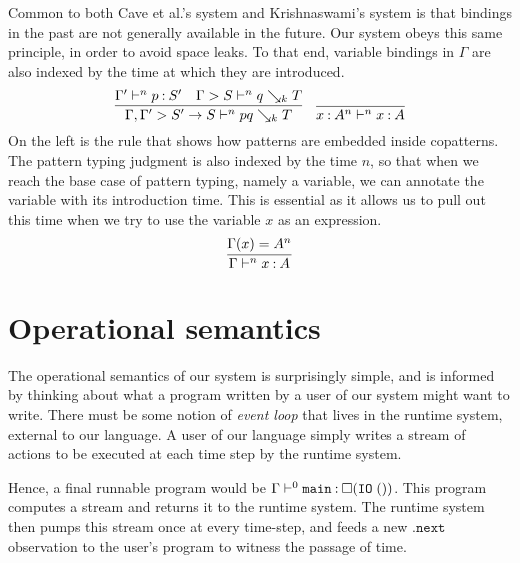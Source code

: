 \documentclass[11pt]{article}
\newcommand{\fun}{\mathtt{fun}}
\newcommand{\always}{\square}
\renewcommand{\next}{\mathtt{.next}}
\renewcommand{\synth}{\searrow}
\newcommand{\IO}{\mathtt{IO}}
\begin{document}
Common to both Cave et al.'s system and Krishnaswami's system is that bindings
in the past are not generally available in the future.
Our system obeys this same principle, in order to avoid space leaks.
To that end, variable bindings in $\Gamma$ are also indexed by the time at
which they are introduced.
%
\begin{equation*}
  \infer{
    \Gamma, \Gamma^\prime > S^\prime \to S \proves^n p q \synth_k T
  }{
    \Gamma^\prime \proves^n p \hastype S^\prime
    &
    \Gamma > S \proves^n q \synth_k T
  }
  \quad
  \infer{
    x \hastype A^n \proves^n x \hastype A
  }{}
\end{equation*}
%
On the left is the rule that shows how patterns are embedded inside copatterns.
The pattern typing judgment is also indexed by the time $n$, so that when we
reach the base case of pattern typing, namely a variable, we can annotate the
variable with its introduction time.
%
This is essential as it allows us to pull out this time when we try to use the
variable $x$ as an expression.
%
\begin{equation*}
  \infer{
    \Gamma \proves^n x \hastype A
  }{
    \Gamma(x) = A^n
  }
\end{equation*}


\section{Operational semantics}
\label{sec:operational}

The operational semantics of our system is surprisingly simple, and is informed
by thinking about what a program written by a user of our system might want to
write.
There must be some notion of \emph{event loop} that lives in the runtime
system, external to our language.
A user of our language simply writes a stream of actions to be executed at
each time step by the runtime system.

Hence, a final runnable program would be
$\Gamma \proves^0 \mathtt{main} \hastype \always (\IO\; ())$.
This program computes a stream and returns it to the runtime system.
The runtime system then pumps this stream once at every time-step, and
feeds a new $\next$ observation to the user's program to witness the passage
of time.
\end{document}
